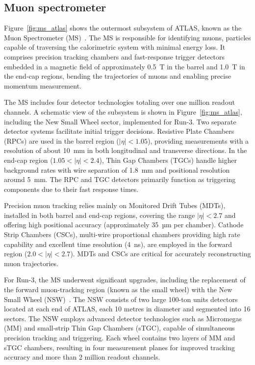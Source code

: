 \subsection{Muon spectrometer}
\label{sec:muon}


Figure~\ref{fig:ms_atlas} shows the outermost subsystem of ATLAS, known as the Muon Spectrometer (MS)~\cite{muon_com}. The MS is responsible for identifying muons, particles capable of traversing the calorimetric system with minimal energy loss. It comprises precision tracking chambers and fast-response trigger detectors embedded in a magnetic field of approximately 0.5~T in the barrel and 1.0~T in the end-cap regions, bending the trajectories of muons and enabling precise momentum measurement.

The MS includes four detector technologies totaling over one million readout channels. A schematic view of the subsystem is shown in Figure~\ref{fig:ms_atlas}, including the New Small Wheel sector, implemented for Run-3. Two separate detector systems facilitate initial trigger decisions. Resistive Plate Chambers (RPCs) are used in the barrel region ($|\eta| < 1.05$), providing measurements with a resolution of about 10~mm in both longitudinal and transverse directions. In the end-cap region ($1.05 < |\eta| < 2.4$), Thin Gap Chambers (TGCs) handle higher background rates with wire separation of 1.8~mm and positional resolution around 5~mm. The RPC and TGC detectors primarily function as triggering components due to their fast response times.

Precision muon tracking relies mainly on Monitored Drift Tubes (MDTs), installed in both barrel and end-cap regions, covering the range $|\eta| < 2.7$ and offering high positional accuracy (approximately 35~µm per chamber). Cathode Strip Chambers (CSCs), multi-wire proportional chambers providing high rate capability and excellent time resolution (4~ns), are employed in the forward region ($2.0 < |\eta| < 2.7$). MDTs and CSCs are critical for accurately reconstructing muon trajectories.

For Run-3, the MS underwent significant upgrades, including the replacement of the forward muon-tracking region (known as the small wheel) with the New Small Wheel (NSW)~\cite{nsw_tech}. The NSW consists of two large 100-ton units detectors located at each end of ATLAS, each 10 metres in diameter and segmented into 16 sectors. The NSW employs advanced detector technologies such as Micromegas (MM) and small-strip Thin Gap Chambers (sTGC), capable of simultaneous precision tracking and triggering. Each wheel contains two layers of MM and sTGC chambers, resulting in four measurement planes for improved tracking accuracy and more than 2 million readout channels.

